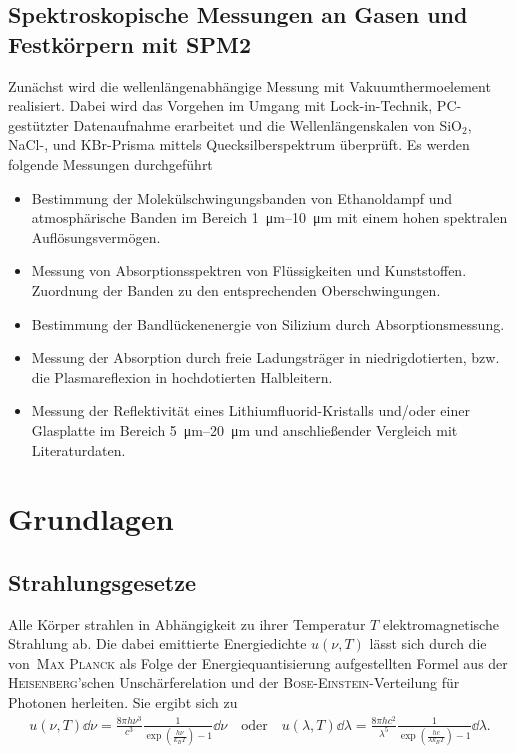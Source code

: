\documentclass[a4paper,twoside,final]{article}
\begin{document}
\subsection{Spektroskopische Messungen an Gasen und Festkörpern mit SPM2}
Zunächst wird die wellenlängenabhängige Messung mit Vakuumthermoelement realisiert. Dabei wird das Vorgehen im Umgang mit Lock-in-Technik, PC-gestützter Datenaufnahme erarbeitet und die Wellenlängenskalen von SiO$_2$, NaCl-, und KBr-Prisma mittels Quecksilberspektrum überprüft. Es werden folgende Messungen durchgeführt
\begin{itemize}
  \item Bestimmung der Molekülschwingungsbanden von Ethanoldampf und atmosphärische Banden im Bereich \SIrange{1}{10}{\micro\metre} mit einem hohen spektralen Auflösungsvermögen.
  \item Messung von Absorptionsspektren von Flüssigkeiten und Kunststoffen. Zuordnung der Banden zu den entsprechenden Oberschwingungen.
  \item Bestimmung der Bandlückenenergie von Silizium durch Absorptionsmessung.
  \item Messung der Absorption durch freie Ladungsträger in niedrigdotierten, bzw. die Plasmareflexion in hochdotierten Halbleitern.
  \item Messung der Reflektivität eines Lithiumfluorid-Kristalls und/oder einer Glasplatte im Bereich \SIrange{5}{20}{\micro\metre} und anschließender Vergleich mit Literaturdaten.
\end{itemize}

\newpage
\section{Grundlagen} \label{sec:Grundlagen}
\subsection{Strahlungsgesetze}
Alle Körper strahlen in Abhängigkeit zu ihrer Temperatur $T$ elektromagnetische Strahlung ab. Die dabei emittierte Energiedichte $u(\nu,T)$ lässt sich durch die von~\textsc{Max Planck} als Folge der Energiequantisierung aufgestellten Formel aus der \textsc{Heisenberg}'schen Unschärferelation und der \textsc{Bose-Einstein}-Verteilung für Photonen herleiten. Sie ergibt sich zu~\cite[S.75]{Demtroder}
\begin{align}\label{eqn:2.1}
    u(\nu,T)\dd{\nu} = \frac{8\pi h \nu^3}{c^3}\frac{1}{\exp(\frac{h\nu}{k_B T})-1}\dd{\nu} \quad\text{oder}\quad u(\lambda,T)\dd{\lambda} = \frac{8\pi h c^2}{\lambda^5}\frac{1}{\exp(\frac{hc}{\lambda k_B T})-1}\dd{\lambda}.
\end{align}
\end{document}
